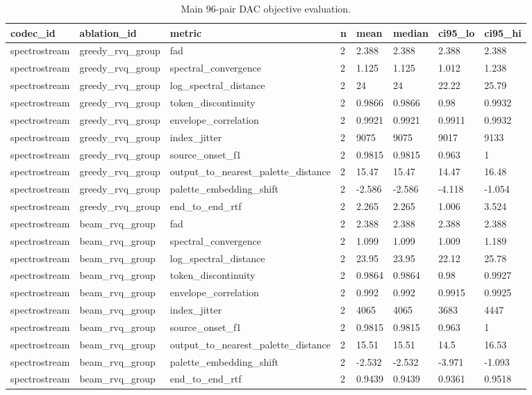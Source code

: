 \begin{table}[t]
\centering
\small
\begin{tabular}{llllllll}
\toprule
codec\_id & ablation\_id & metric & n & mean & median & ci95\_lo & ci95\_hi \\
\midrule
spectrostream & greedy\_rvq\_group & fad & 2 & 2.388 & 2.388 & 2.388 & 2.388 \\
spectrostream & greedy\_rvq\_group & spectral\_convergence & 2 & 1.125 & 1.125 & 1.012 & 1.238 \\
spectrostream & greedy\_rvq\_group & log\_spectral\_distance & 2 & 24 & 24 & 22.22 & 25.79 \\
spectrostream & greedy\_rvq\_group & token\_discontinuity & 2 & 0.9866 & 0.9866 & 0.98 & 0.9932 \\
spectrostream & greedy\_rvq\_group & envelope\_correlation & 2 & 0.9921 & 0.9921 & 0.9911 & 0.9932 \\
spectrostream & greedy\_rvq\_group & index\_jitter & 2 & 9075 & 9075 & 9017 & 9133 \\
spectrostream & greedy\_rvq\_group & source\_onset\_f1 & 2 & 0.9815 & 0.9815 & 0.963 & 1 \\
spectrostream & greedy\_rvq\_group & output\_to\_nearest\_palette\_distance & 2 & 15.47 & 15.47 & 14.47 & 16.48 \\
spectrostream & greedy\_rvq\_group & palette\_embedding\_shift & 2 & -2.586 & -2.586 & -4.118 & -1.054 \\
spectrostream & greedy\_rvq\_group & end\_to\_end\_rtf & 2 & 2.265 & 2.265 & 1.006 & 3.524 \\
spectrostream & beam\_rvq\_group & fad & 2 & 2.388 & 2.388 & 2.388 & 2.388 \\
spectrostream & beam\_rvq\_group & spectral\_convergence & 2 & 1.099 & 1.099 & 1.009 & 1.189 \\
spectrostream & beam\_rvq\_group & log\_spectral\_distance & 2 & 23.95 & 23.95 & 22.12 & 25.78 \\
spectrostream & beam\_rvq\_group & token\_discontinuity & 2 & 0.9864 & 0.9864 & 0.98 & 0.9927 \\
spectrostream & beam\_rvq\_group & envelope\_correlation & 2 & 0.992 & 0.992 & 0.9915 & 0.9925 \\
spectrostream & beam\_rvq\_group & index\_jitter & 2 & 4065 & 4065 & 3683 & 4447 \\
spectrostream & beam\_rvq\_group & source\_onset\_f1 & 2 & 0.9815 & 0.9815 & 0.963 & 1 \\
spectrostream & beam\_rvq\_group & output\_to\_nearest\_palette\_distance & 2 & 15.51 & 15.51 & 14.5 & 16.53 \\
spectrostream & beam\_rvq\_group & palette\_embedding\_shift & 2 & -2.532 & -2.532 & -3.971 & -1.093 \\
spectrostream & beam\_rvq\_group & end\_to\_end\_rtf & 2 & 0.9439 & 0.9439 & 0.9361 & 0.9518 \\
\bottomrule
\end{tabular}
\caption{Main 96-pair DAC objective evaluation.}
\label{tab:dac-main-full96}
\end{table}
